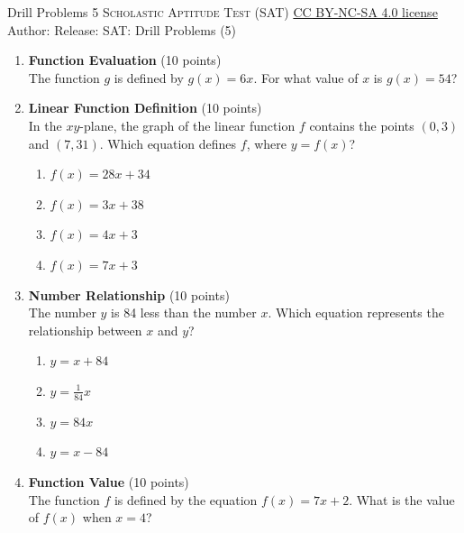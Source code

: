 \newpage\handout
{Drill Problems 5}
{\textsc{Scholastic Aptitude Test (SAT)}}
{\href{https://creativecommons.org/licenses/by-nc-sa/4.0/}{CC BY-NC-SA 4.0 license}}
{Author: \BookAuthor}{Release: \generatedOn}
{SAT: Drill Problems (5)}


\begin{enumerate}
  \item \textbf{Function Evaluation} (10 points)\\
  The function $g$ is defined by $g(x)=6x$. For what value of $x$ is $g(x)=54$?
  \begin{subanswer}
  \end{subanswer}

  \item \textbf{Linear Function Definition} (10 points)\\
  In the $xy$-plane, the graph of the linear function $f$ contains the points $(0,3)$ and $(7,31)$. Which equation defines $f$, where $y=f(x)$?\\
  \begin{enumerate}[label=(\Alph*)]
    \item $f(x)=28x+34$
    \item $f(x)=3x+38$
    \item $f(x)=4x+3$
    \item $f(x)=7x+3$
  \end{enumerate}
  \begin{subanswer}
  \end{subanswer}

  \item \textbf{Number Relationship} (10 points)\\
  The number $y$ is 84 less than the number $x$. Which equation represents the relationship between $x$ and $y$?\\
  \begin{enumerate}[label=(\Alph*)]
    \item $y=x+84$
    \item $y=\frac{1}{84}x$
    \item $y=84x$
    \item $y=x-84$
  \end{enumerate}
  \begin{subanswer}
  \end{subanswer}

  \item \textbf{Function Value} (10 points)\\
  The function $f$ is defined by the equation $f(x)=7x+2$. What is the value of $f(x)$ when $x=4$?
  \begin{subanswer}
  \end{subanswer}




\end{enumerate}
